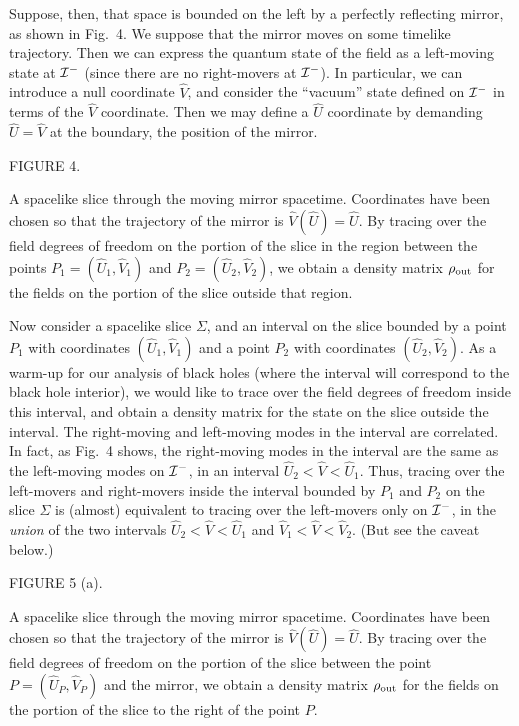 Suppose, then, that space is bounded on the left by a perfectly reflecting
mirror, as shown in Fig.~4.  We suppose that the mirror moves on some timelike
trajectory.  Then we can express the quantum state of the field as a
left-moving state at ${\cal I}^-$ (since there are no right-movers at ${\cal
I}^-$).  In particular, we can introduce a null coordinate $\hat V$, and
consider the ``vacuum'' state defined on ${\cal I}^-$ in terms of the $\hat V$
coordinate.  Then we may define a $\hat U$ coordinate by demanding $\hat U=\hat
V$ at the boundary, the position of the mirror.

\midinsert
\epsfysize=5in
\centerline{ }
\bigskip
\centerline{FIGURE 4.}
\medskip
{\centerline{\vbox{\hsize 5in \singlespace\tenrm \noindent
A spacelike slice through the moving mirror spacetime.
Coordinates have been chosen so that the trajectory of the mirror is $\hat
V(\hat U)=\hat U$. By tracing over the field degrees of freedom on the portion
of the slice in the region between the points $P_1=(\hat U_1, \hat V_1)$ and
$P_2=(\hat U_2,\hat V_2)$, we obtain a density matrix $\rho_{\rm out}$ for the
fields on the portion of the slice outside that region.
 }}}


\endinsert

Now consider a spacelike slice $\Sigma$, and an interval on the slice bounded
by a point $P_1$ with coordinates
$({\hat U}_1,{\hat V}_1)$ and a point $P_2$
with coordinates $({\hat U}_2,{\hat V}_2)$.  As a warm-up for our analysis of
black holes (where the interval will correspond to the black hole interior), we
would like to trace over the
field degrees of freedom inside this interval, and obtain a density matrix for
the state on the slice outside the interval.  The right-moving and left-moving
modes in the interval are correlated.  In fact, as Fig.~4 shows, the
right-moving modes in the interval are the same as the left-moving modes on
${\cal I}^-$, in an interval ${\hat U}_2<\hat V< {\hat U}_1$.  Thus, tracing
over the left-movers and right-movers inside the interval bounded by $P_1$ and
$P_2$
on the slice $\Sigma$ is (almost) equivalent to tracing over the left-movers
only on ${\cal I}^-$, in the {\it union} of the two intervals ${\hat U}_2<\hat
V< {\hat U}_1$ and ${\hat V}_1<\hat V< {\hat V}_2$.  (But see the caveat
below.)

\midinsert
\epsfysize=5in
\centerline{ }
\bigskip
\centerline{FIGURE 5 (a).}
\medskip
{\centerline{\vbox{\hsize 5in \singlespace\tenrm \noindent
A spacelike slice through the moving mirror
spacetime.  Coordinates have been chosen so that the trajectory of the mirror
is $\hat V(\hat U)=\hat U$.  By tracing over the field degrees of freedom on
the portion of the slice between the point $P=(\hat U_P,\hat V_P)$ and the
mirror, we obtain a density matrix $\rho_{\rm out}$ for the fields on the
portion of the slice to the right of the point $P$.
 }}}


